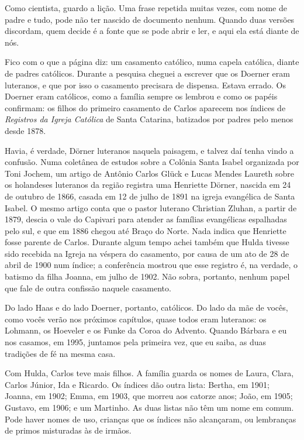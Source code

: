 \documentclass[
  brazilian,
  11pt,
  openany]{book}
\begin{document}
Como cientista, guardo a lição. Uma frase repetida muitas vezes, com
nome de padre e tudo, pode não ter nascido de documento nenhum. Quando
duas versões discordam, quem decide é a fonte que se pode abrir e ler, e
aqui ela está diante de nós.

Fico com o que a página diz: um casamento católico, numa capela
católica, diante de padres católicos. Durante a pesquisa cheguei a
escrever que os Doerner eram luteranos, e que por isso o casamento
precisara de dispensa. Estava errado. Os Doerner eram católicos, como a
família sempre os lembrou e como os papéis confirmam: os filhos do
primeiro casamento de Carlos aparecem nos índices de \emph{Registros da
Igreja Católica} de Santa Catarina, batizados por padres pelo menos
desde 1878.

Havia, é verdade, Dörner luteranos naquela paisagem, e talvez daí tenha
vindo a confusão. Numa coletânea de estudos sobre a Colônia Santa Isabel
organizada por Toni Jochem, um artigo de Antônio Carlos Glück e Lucas
Mendes Laureth sobre os holandeses luteranos da região registra uma
Henriette Dörner, nascida em 24 de outubro de 1866, casada em 12 de
julho de 1891 na igreja evangélica de Santa Isabel. O mesmo artigo conta
que o pastor luterano Christian Zluhan, a partir de 1879, descia o vale
do Capivari para atender as famílias evangélicas espalhadas pelo sul, e
que em 1886 chegou até Braço do Norte. Nada indica que Henriette fosse
parente de Carlos. Durante algum tempo achei também que Hulda tivesse
sido recebida na Igreja na véspera do casamento, por causa de um ato de
28 de abril de 1900 num índice; a conferência mostrou que esse registro
é, na verdade, o batismo da filha Joanna, em julho de 1902. Não sobra,
portanto, nenhum papel que fale de outra confissão naquele casamento.

Do lado Haas e do lado Doerner, portanto, católicos. Do lado da mãe de
vocês, como vocês verão nos próximos capítulos, quase todos eram
luteranos: os Lohmann, os Hoeveler e os Funke da Coroa do Advento.
Quando Bárbara e eu nos casamos, em 1995, juntamos pela primeira vez,
que eu saiba, as duas tradições de fé na mesma casa.

Com Hulda, Carlos teve mais filhos. A família guarda os nomes de Laura,
Clara, Carlos Júnior, Ida e Ricardo. Os índices dão outra lista: Bertha,
em 1901; Joanna, em 1902; Emma, em 1903, que morreu aos catorze anos;
João, em 1905; Gustavo, em 1906; e um Martinho. As duas listas não têm
um nome em comum. Pode haver nomes de uso, crianças que os índices não
alcançaram, ou lembranças de primos misturadas às de irmãos.
\end{document}

